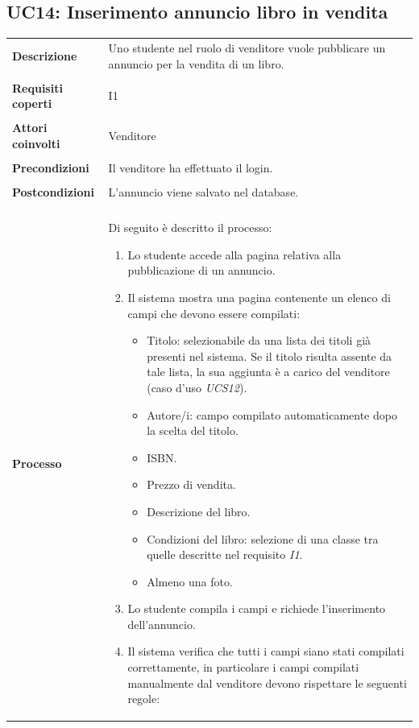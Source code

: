 \documentclass[10pt,a4paper]{article}
\begin{document}
	
	\subsection{UC14: Inserimento annuncio libro in vendita}
	\begin{tabular}{lp{}}
		\textbf{Descrizione}&Uno studente nel ruolo di venditore vuole pubblicare un annuncio per la vendita di un libro.\\
		\\
		\textbf{Requisiti coperti}&I1\\
		\\
		\textbf{Attori coinvolti}&Venditore\\
		\\
		\textbf{Precondizioni}&Il venditore ha effettuato il login.\\
		\\
		\textbf{Postcondizioni}&L'annuncio viene salvato nel database.\\
		\\
		\textbf{Processo}&Di seguito è descritto il processo:
		\begin{enumerate}
			\item Lo studente accede alla pagina relativa alla pubblicazione di un annuncio.
			\item Il sistema mostra una pagina contenente un elenco di campi che devono essere compilati:
			\begin{itemize}
				\item Titolo: selezionabile da una lista dei titoli già presenti nel sistema. Se il titolo risulta assente da tale lista, la sua aggiunta è a carico del venditore (caso d'uso \textit{UCS12}).
				\item Autore/i: campo compilato automaticamente dopo la scelta del titolo.
				\item ISBN.
				\item Prezzo di vendita.
				\item Descrizione del libro.
				\item Condizioni del libro: selezione di una classe tra quelle descritte nel requisito \textit{I1}.
				\item Almeno una foto.
			\end{itemize}
			\item Lo studente compila i campi e richiede l'inserimento dell'annuncio.
			\item Il sistema verifica che tutti i campi siano stati compilati correttamente, in particolare i campi compilati manualmente dal venditore devono rispettare le seguenti regole:

\end{enumerate}
\end{tabular}
\end{document}
